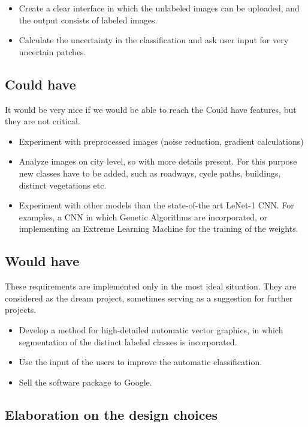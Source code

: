 \documentclass[a4paper,onecolumn]{report}
\begin{document}
\begin{itemize}
\item Create a clear interface in which the unlabeled images can be uploaded, and the output consists of labeled images. 
\item Calculate the uncertainty in the classification and ask user input for very uncertain patches.
\end{itemize}

\subsection{Could have}
It would be very nice if we would be able to reach the Could have features, but they are not critical. 
\begin{itemize}
\item Experiment with preprocessed images (noise reduction, gradient calculations)
\item Analyze images on city level, so with more details present. For this purpose new classes have to be added, such as roadways, cycle paths, 	buildings, distinct vegetations etc. 
\item Experiment with other models than the state-of-the art LeNet-1 CNN. For examples, a CNN in which Genetic Algorithms are incorporated, or implementing an Extreme Learning Machine for the training of the weights. 
\end{itemize}

\subsection{Would have}
These requirements are implemented only in the most ideal situation. They are considered as the dream project, sometimes serving as a suggestion for further projects. 

\begin{itemize}
\item Develop a method for high-detailed automatic vector graphics, in which segmentation of the distinct labeled classes is incorporated.
\item Use the input of the users to improve the automatic classification. 
\item Sell the software package to Google. 
\end{itemize}

\subsection{Elaboration on the design choices}
\end{document}
